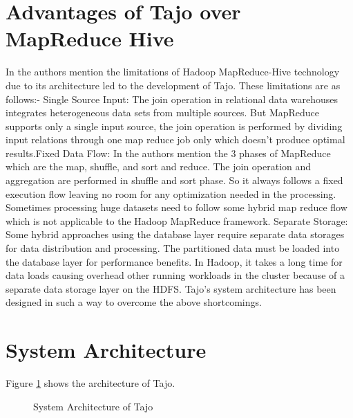 \documentclass[9pt,twocolumn,twoside]{styles/osajnl}
\begin{document}
\section{Advantages of Tajo over MapReduce Hive}
In \cite{tajo-paper} the authors mention the limitations of Hadoop
\cite{mapreduce-article} \cite{hive-paper} MapReduce-Hive technology
due to its architecture led to the development of Tajo. These
limitations are as follows:- \newline \newline Single Source Input:
The join operation in relational data warehouses integrates
heterogeneous data sets from multiple sources. But MapReduce supports
only a single input source, the join operation is performed by
dividing input relations through one map reduce job only which doesn't
produce optimal results.\newline \newline Fixed Data Flow: In
\cite{tajo-paper} the authors mention the 3 phases of MapReduce which
are the map, shuffle, and sort and reduce. The join operation and
aggregation are performed in shuffle and sort phase. So it always
follows a fixed execution flow leaving no room for any optimization
needed in the processing. Sometimes processing huge datasets need to
follow some hybrid map reduce flow which is not applicable to the
Hadoop MapReduce framework. \newline \newline
Separate Storage: Some hybrid approaches \cite{tajo-paper} using the
database layer require separate data storages for data distribution
and processing. The partitioned data must be loaded into the database
layer for performance benefits. In Hadoop, it takes a long time for
data loads causing overhead other running workloads in the cluster
because of a separate data storage layer on the HDFS.\newline \newline
Tajo's system architecture has been designed in such a way to overcome
the above shortcomings.


\section{System Architecture}

Figure \ref{fig:architecture} shows the architecture of Tajo. 

\begin{figure}[htbp]
\centering
{}
\caption{\cite{tajo-paper} System Architecture of Tajo}
\label{fig:architecture}
\end{figure}
\end{document}

